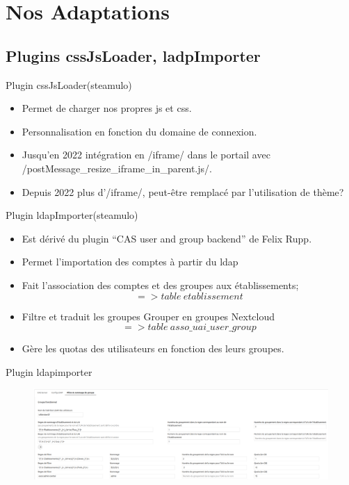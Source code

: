 \section{Nos Adaptations}
\subsection{Plugins cssJsLoader, ladpImporter}
\begin{frame}[fragile]{Plugin cssJsLoader}{(steamulo)}
\begin{itemize}
\item Permet de charger nos propres js et css.
\item Personnalisation en fonction du domaine de connexion.
\item Jusqu'en 2022 intégration en \code/iframe/ dans le portail avec \code/postMessage_resize_iframe_in_parent.js/.
\item Depuis 2022 plus d'\code/iframe/, peut-être remplacé par l'utilisation de thème? 
\end{itemize}
\end{frame} 

\begin{frame}{Plugin ldapImporter}{(steamulo)} %
\begin{itemize}
\item Est dérivé du plugin ``CAS user and group backend'' de Felix Rupp.
\item Permet l'importation des comptes à partir du ldap
\item Fait l'association des comptes et des groupes aux établissements;
		{\small $$ => table\ etablissement $$} 
\item Filtre et traduit les groupes Grouper en groupes Nextcloud
		{\small $$ => table\ asso\_uai\_user\_group $$ } 
\item Gère les quotas des utilisateurs en fonction des leurs groupes.
\end{itemize}
\end{frame}


\begin{frame}{Plugin ldapimporter} %
\begin{figure}
\includegraphics[width=\textwidth, height=0.85\textheight]{ldapimporter.png}
\end{figure}
\end{frame}

